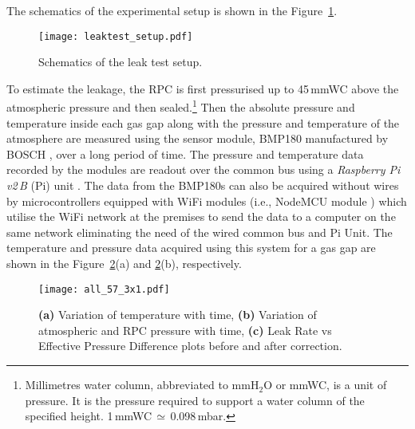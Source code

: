 The schematics of the experimental setup is shown in the
Figure~\ref{fig:schematics}.
\begin{figure}
  \centering
  \texttt{[image: leaktest\_setup.pdf]}
  \caption{Schematics of the leak test setup.}
  \label{fig:schematics}
\end{figure}
To estimate the leakage, the RPC is first pressurised up to 45\,mmWC
above the atmospheric pressure and then sealed.\footnote{Millimetres water column, abbreviated to mmH$_2$O or mmWC, is a unit of pressure. It is the pressure required to support a water column of the specified height. 1\,mmWC\,$\simeq$\,0.098\,mbar.}
Then the absolute pressure and temperature inside each gas gap along
with the pressure and temperature of the atmosphere are measured using
the sensor module, BMP180 manufactured by BOSCH \cite{bmp180}, over a
long period of time. The pressure and temperature data recorded by the
modules are readout over the common bus using a
\textit{Raspberry Pi\,v2\,B} (Pi) unit \cite{rpi}. The data from the
BMP180s can also be acquired without wires by microcontrollers
equipped with WiFi modules (i.e., NodeMCU module \cite{nodemcu2015})
which utilise the WiFi network at the premises to send the data to a
computer on the same network eliminating the need of the wired common
bus and Pi Unit. The temperature and pressure data acquired using this
system for a gas gap are shown in the Figure~\ref{fig:temp}(a) and
\ref{fig:temp}(b), respectively.
\begin{figure}[h!]
  \centering
  \texttt{[image: all\_57\_3x1.pdf]}
  \caption{\textbf{(a)} Variation of temperature with time,
    \textbf{(b)} Variation of atmospheric and RPC pressure with time,
    \textbf{(c)} Leak Rate vs Effective Pressure Difference plots
    before and after correction.}
  \label{fig:temp}
\end{figure}


